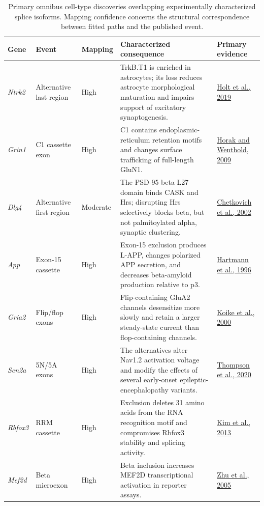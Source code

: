 \documentclass[11pt]{article}
\begin{document}
\begin{table}[H]
\centering
\scriptsize
\caption{Primary omnibus cell-type discoveries overlapping experimentally characterized splice isoforms. Mapping confidence concerns the structural correspondence between fitted paths and the published event.}
\label{tab:production-functional-precedents}
\begin{tabular}{p{1.0cm}p{2.1cm}p{1.3cm}p{7.3cm}p{2.4cm}}
\toprule
Gene & Event & Mapping & Characterized consequence & Primary evidence\\
\midrule
\emph{Ntrk2} & Alternative last region & High & TrkB.T1 is enriched in astrocytes; its loss reduces astrocyte morphological maturation and impairs support of excitatory synaptogenesis. & \href{https://doi.org/10.7554/eLife.44667}{Holt et al., 2019}\\
\emph{Grin1} & C1 cassette exon & High & C1 contains endoplasmic-reticulum retention motifs and changes surface trafficking of full-length GluN1. & \href{https://doi.org/10.1074/jbc.M807050200}{Horak and Wenthold, 2009}\\
\emph{Dlg4} & Alternative first region & Moderate & The PSD-95 beta L27 domain binds CASK and Hrs; disrupting Hrs selectively blocks beta, but not palmitoylated alpha, synaptic clustering. & \href{https://doi.org/10.1523/JNEUROSCI.22-15-06415.2002}{Chetkovich et al., 2002}\\
\emph{App} & Exon-15 cassette & High & Exon-15 exclusion produces L-APP, changes polarized APP secretion, and decreases beta-amyloid production relative to p3. & \href{https://doi.org/10.1074/jbc.271.22.13208}{Hartmann et al., 1996}\\
\emph{Gria2} & Flip/flop exons & High & Flip-containing GluA2 channels desensitize more slowly and retain a larger steady-state current than flop-containing channels. & \href{https://doi.org/10.1523/JNEUROSCI.20-06-02166.2000}{Koike et al., 2000}\\
\emph{Scn2a} & 5N/5A exons & High & The alternatives alter Nav1.2 activation voltage and modify the effects of several early-onset epileptic-encephalopathy variants. & \href{https://doi.org/10.1085/jgp.201912442}{Thompson et al., 2020}\\
\emph{Rbfox3} & RRM cassette & High & Exclusion deletes 31 amino acids from the RNA recognition motif and compromises Rbfox3 stability and splicing activity. & \href{https://doi.org/10.1083/jcb.201206146}{Kim et al., 2013}\\
\emph{Mef2d} & Beta microexon & High & Beta inclusion increases MEF2D transcriptional activation in reporter assays. & \href{https://doi.org/10.1074/jbc.M502491200}{Zhu et al., 2005}\\
\bottomrule
\end{tabular}
\end{table}
\end{document}

